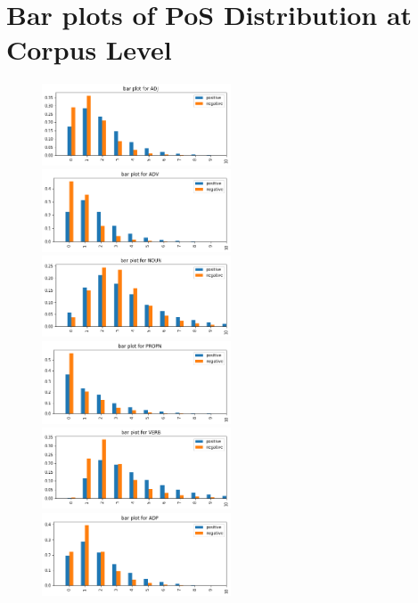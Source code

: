 \documentclass[12pt]{diazessay} %
\begin{document}
\section{Bar plots of PoS Distribution at Corpus Level} %
\label{sec:appendix_a_bar_plots_of_pos_distribution_at_corpus_level}
    \begin{figure}[h!]
    \includegraphics[width=0.5\textwidth]{graphs/bar_pos/1.png}
    \includegraphics[width=0.5\textwidth]{graphs/bar_pos/2.png}
    \includegraphics[width=0.5\textwidth]{graphs/bar_pos/3.png}
    \includegraphics[width=0.5\textwidth]{graphs/bar_pos/4.png}
    \includegraphics[width=0.5\textwidth]{graphs/bar_pos/5.png}
    \includegraphics[width=0.5\textwidth]{graphs/bar_pos/6.png}

\end{figure}
\end{document}
